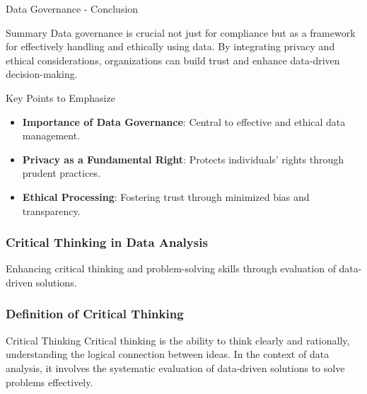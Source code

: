 \documentclass[aspectratio=169]{beamer}
\begin{document}
\begin{frame}[fragile]{Data Governance - Conclusion}
    \begin{block}{Summary}
        Data governance is crucial not just for compliance but as a framework for effectively handling and ethically using data. 
        By integrating privacy and ethical considerations, organizations can build trust and enhance data-driven decision-making.
    \end{block}

    \begin{block}{Key Points to Emphasize}
        \begin{itemize}
            \item \textbf{Importance of Data Governance}: Central to effective and ethical data management.
            \item \textbf{Privacy as a Fundamental Right}: Protects individuals' rights through prudent practices.
            \item \textbf{Ethical Processing}: Fostering trust through minimized bias and transparency.
        \end{itemize}
    \end{block}
\end{frame}

\begin{frame}[fragile]
    \frametitle{Critical Thinking in Data Analysis}
    Enhancing critical thinking and problem-solving skills through evaluation of data-driven solutions.
\end{frame}

\begin{frame}[fragile]
    \frametitle{Definition of Critical Thinking}
    \begin{block}{Critical Thinking}
        Critical thinking is the ability to think clearly and rationally, understanding the logical connection between ideas. 
        In the context of data analysis, it involves the systematic evaluation of data-driven solutions to solve problems effectively.
    \end{block}
\end{frame}
\end{document}
